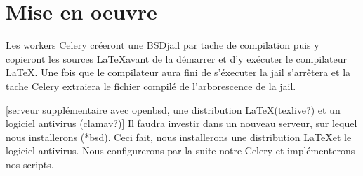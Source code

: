 \documentclass[10pt,a4paper]{article}
\begin{document}
\section{Mise en oeuvre}

Les workers Celery créeront une BSDjail par tache de compilation puis y copieront les sources \LaTeX avant de la démarrer et d'y exécuter le compilateur \LaTeX.
Une fois que le compilateur aura fini de s'éxecuter la jail s'arrêtera et la tache Celery extraiera le fichier compilé de l'arborescence de la jail.

[serveur supplémentaire avec openbsd, une distribution \LaTeX (texlive?) et un logiciel antivirus (clamav?)]
Il faudra investir dans un nouveau serveur, sur lequel nous installerons (*bsd).
Ceci fait, nous installerons une distribution \LaTeX et le logiciel antivirus.
Nous configurerons par la suite notre Celery et implémenterons nos scripts.
\end{document}
